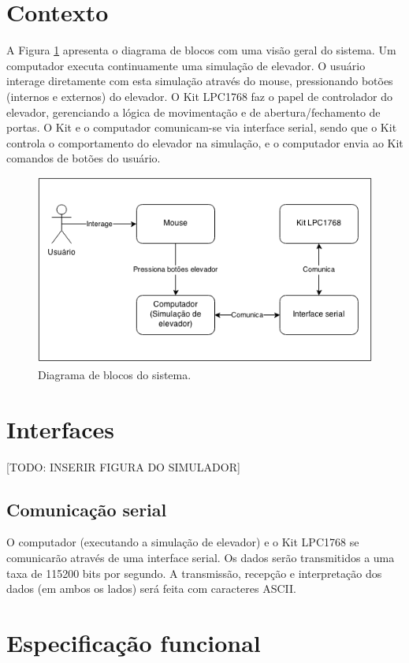 \section{Contexto}

A Figura \ref{fig:diagrama_blocos} apresenta o diagrama de blocos com uma visão geral do sistema. Um computador executa continuamente uma simulação de elevador. O usuário interage diretamente com esta simulação através do mouse, pressionando botões (internos e externos) do elevador. O Kit LPC1768 faz o papel de controlador do elevador, gerenciando a lógica de movimentação e de abertura/fechamento de portas. O Kit e o computador comunicam-se via interface serial, sendo que o Kit controla o comportamento do elevador na simulação, e o computador envia ao Kit comandos de botões do usuário. 

\begin{figure}[h]
    \centering
    \includegraphics[width=0.8\columnwidth]{./figures/diagrama_blocos.png}
    \caption{Diagrama de blocos do sistema.}
    \label{fig:diagrama_blocos}
\end{figure}


\section{Interfaces}
[TODO: INSERIR FIGURA DO SIMULADOR]

\subsection{Comunicação serial}
O computador (executando a simulação de elevador) e o Kit LPC1768 se comunicarão através de uma interface serial. Os dados serão transmitidos a uma taxa de 115200 bits por segundo. A transmissão, recepção e interpretação dos dados (em ambos os lados) será feita com caracteres ASCII.


\section{Especificação funcional}
\label{sec:espec_funcional}



